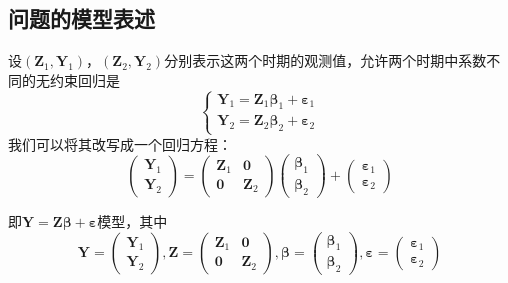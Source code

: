 	\subsection{问题的模型表述}
	设$ \left(\boldsymbol{Z}_{1},\boldsymbol{Y}_{1}\right) $，$ \left(\boldsymbol{Z}_{2},\boldsymbol{Y}_{2}\right) $分别表示这两个时期的观测值，允许两个时期中系数不同的无约束回归是
	$$  \left\{\begin{array}{l}
		   \boldsymbol{Y}_{1}=\boldsymbol{Z}_{1} \boldsymbol{\beta}_{1}+\boldsymbol{\varepsilon}_{1} \\
		   \boldsymbol{Y}_{2}=\boldsymbol{Z}_{2} \boldsymbol{\beta}_{2}+\boldsymbol{\varepsilon}_{2}
	\end{array}\right. $$
	我们可以将其改写成一个回归方程：
	\begin{equation}
		\left(\begin{array}{l}
			\boldsymbol{Y}_{1} \\
			\boldsymbol{Y}_{2}
		\end{array}\right)=\left(\begin{array}{cc}
			\boldsymbol{Z}_{1} & \boldsymbol{0} \\
			\boldsymbol{0} & \boldsymbol{Z}_{2}
		\end{array}\right)\left(\begin{array}{c}
			\boldsymbol{\beta}_{1} \\
			\boldsymbol{\beta}_{2}
		\end{array}\right)+\left(\begin{array}{c}
			\boldsymbol{\varepsilon}_{1} \\
			\boldsymbol{\varepsilon}_{2}
		\end{array}\right)
		\label{eq 7_3_1}
	\end{equation}

	即$ \boldsymbol{Y}=\boldsymbol{Z \beta}+\boldsymbol{\varepsilon} $模型，其中
	$$ \boldsymbol{Y}=\left(\begin{array}{l}
		\boldsymbol{Y}_{1} \\
		\boldsymbol{Y}_{2}
	\end{array}\right),
	\boldsymbol{Z}=\left(\begin{array}{cc}
		\boldsymbol{Z}_{1} & \boldsymbol{0} \\
		\boldsymbol{0} & \boldsymbol{Z}_{2}
	\end{array}\right),
	\boldsymbol{\beta}=\left(\begin{array}{l}
		\boldsymbol{\beta}_{1} \\
		\boldsymbol{\beta}_{2}
	\end{array}\right),
	\boldsymbol{\varepsilon}=\left(\begin{array}{c}
		\boldsymbol{\varepsilon}_{1} \\
		\boldsymbol{\varepsilon}_{2}
	\end{array}\right) $$

